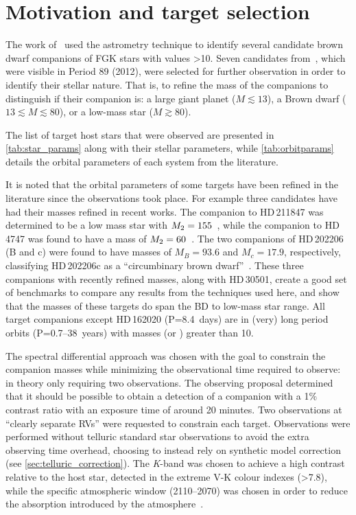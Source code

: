 
\section{Motivation and target selection}
\label{sec:target_motivation}

The work of~\citet{sahlmann_search_2011} used the astrometry technique to identify several candidate brown dwarf companions of {FGK} stars with \Mtwosini{} values >10\Mjup{}.
Seven candidates from~\citet{sahlmann_search_2011}, which were visible in {Period 89} (2012), were selected for further observation in order to identify their stellar nature.
That is, to refine the mass of the companions to distinguish if their companion is: a large giant planet (\(M \apprle 13\)\Mjup{}), a Brown dwarf (\(13 \apprle M \apprle 80\)\Mjup{}), or a low-mass star (\(M \apprge 80\)\Mjup).

The list of target host stars that were observed are presented in \cref{tab:star_params} along with their stellar parameters, while \cref{tab:orbitparams} details the orbital parameters of each system from the literature.

It is noted that the orbital parameters of some targets have been refined in the literature since the observations took place.
For example three candidates have had their masses refined in recent works.
The companion to {HD\,211847} was determined to be a low mass star with \({M}_{2}=155\)\Mjup{}~\citep{moutou_eccentricity_2017}, while the companion to {HD\,4747} was found to have a mass of \({M}_{2}=60\)\Mjup{}~\citep{crepp_trends_2016}.
The two companions of {HD\,202206} (B and c) were found to have masses of \({M}_{B}=93.6\)\Mjup{} and \({M}_{c}=17.9\)\Mjup{}, respectively, classifying {HD\,202206}c as a ``circumbinary brown dwarf''~\citep{benedict_hd_2017}.
These three companions with recently refined masses, along with {HD\,30501}, create a good set of benchmarks to compare any results from the techniques used here, and show that the masses of these targets do span the {BD} to low-mass star range.
All target companions except {HD\,162020} (P=8.4~days) are in (very) long period orbits (P=0.7--38~years) with masses (or \Mtwosini{}) greater than 10\Mjup{}.

The spectral differential approach was chosen with the goal to constrain the companion masses while minimizing the observational time required to observe: in theory only requiring two observations.
The observing proposal determined that it should be possible to obtain a detection of a companion with a 1\% contrast ratio with an exposure time of around 20 minutes.
Two observations at ``clearly separate {RV}s'' were requested to constrain each target.
Observations were performed without telluric standard star observations to avoid the extra observing time overhead, choosing to instead rely on synthetic model correction (see \cref{sec:telluric_correction}).
The \textit{K}-band was chosen to achieve a high contrast relative to the host star, detected in the extreme V-K colour indexes (>7.8), while the specific atmospheric window (2110--2070\nm{}) was chosen in order to reduce the absorption introduced by the atmosphere~\citep{barnes_hd_2008}.

\begin{landscape}
    
    
\end{landscape}

